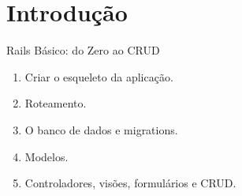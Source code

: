 \section{Introdução}
\begin{frame}{Rails Básico: do Zero ao CRUD}
  \begin{enumerate}
    \item Criar o esqueleto da aplicação.
    \item Roteamento.
    \item O banco de dados e migrations. 
    \item Modelos.
    \item Controladores, visões, formulários e CRUD.  
  \end{enumerate}
   
\end{frame}
